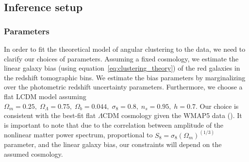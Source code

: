 \documentclass{aa}
\numberwithin{equation}{section}
\newcommand{\mjv}{\textcolor{cyan}}
\newcommand{\mb}{\textcolor{brown}}
\begin{document}
\subsection{Inference setup}\label{sec:inference}

\subsubsection{Parameters}

In order to fit the theoretical model of angular clustering to the data, we need to clarify our choices of parameters. Assuming a fixed cosmology, we estimate the linear galaxy bias (using equation~\ref{eq:clustering_theory}) of the red galaxies in the redshift tomographic bins. We estimate the bias parameters by marginalizing over the photometric redshift uncertainty parameters.  
Furthermore, we choose a flat LCDM model assuming $\Omega_m = 0.25, \;\Omega_{\Lambda} = 0.75, \; \Omega_b = 0.044, \; \sigma_{8} = 0.8, \; n_s = 0.95, \; h = 0.7$. Our choice is consistent with the 
best-fit flat $\Lambda$CDM cosmology given the WMAP5 data (\citealt{WMAP5}). It is important to note that due to the correlation between amplitude of the nonlinear matter power spectrum, proportional to $S_8 = \sigma_8(\Omega_m)^{(1/3)}$ parameter, and the linear galaxy bias, our constraints will depend on the assumed cosmology.



\end{document}
